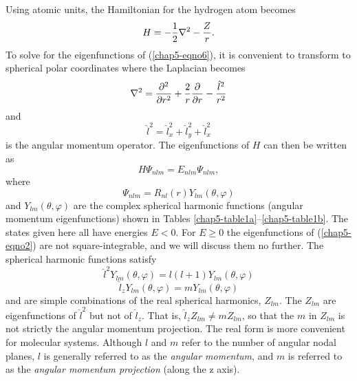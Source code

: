 Using atomic units, the Hamiltonian for the hydrogen atom becomes
\begin{equation}
H = - {1 \over 2} \nabla^2 - {Z \over r} .
\label{chap5-eqno6}
\end{equation} To solve for the eigenfunctions of (\ref{chap5-eqno6}), it is
convenient to transform to spherical polar coordinates where the
Laplacian becomes
\begin{equation}
\nabla^2 = {\partial^2 \over \partial r^2} + {2 \over r} {\partial \over 
\partial r} - {{\hat l}^2 \over r^2}
\label{chap5-eqno7}
\end{equation}
and
\begin{equation}
{\hat l}^2 = {\hat l}^2_x + {\hat l}^2_y + {\hat l}^2_x
\end{equation}
is the angular momentum operator.  The eigenfunctions of $H$ can 
then be written as
\begin{equation}
H\Psi_{nlm} = E_{nlm} \Psi_{nlm} ,
\end{equation}
where
\begin{equation}
\Psi_{nlm} = R_{nl} (r) Y_{lm} ( \theta ,\varphi )
\label{chap5-eqno8}
\end{equation} 
and $Y_{lm}(\theta , \varphi)$ are the complex spherical harmonic
functions (angular momentum eigenfunctions) shown in Tables
\ref{chap5-table1a}--\ref{chap5-table1b}.  The states given here all
have energies $E < 0$.  For $E \geq 0$ the eigenfunctions of
(\ref{chap5-eqno2}) are not square-integrable, and we will discuss
them no further.  The spherical harmonic functions satisfy
\begin{equation}
{\hat l}^2 Y_{lm} ( \theta , \varphi ) = l ( l + 1 ) Y_{lm} ( \theta 
,\varphi)
\label{chap5-eqno9a}
\end{equation}
\begin{equation}
{\hat l}_z Y_{lm} ( \theta , \varphi ) = mY_{lm} ( \theta , \varphi 
)
\label{chap5-eqno9b}
\end{equation}
and are simple combinations of the real spherical harmonics, $Z_{lm}$.  
The $Z_{lm}$ are eigenfunctions of ${\hat l}^2$ but not of ${\hat l}_z$.  
That is, ${\hat l}_zZ_{lm} \not= mZ_{lm}$, so that the $m$ in $Z_{lm}$ 
is not strictly the angular momentum projection.  The real form is more 
convenient for molecular systems. Although $l$ and $m$ refer to  
the number of angular nodal planes, $l$ is generally referred to as the 
\emph{angular momentum}, and $m$ is referred to as the \emph{angular
momentum projection} (along the z axis).

